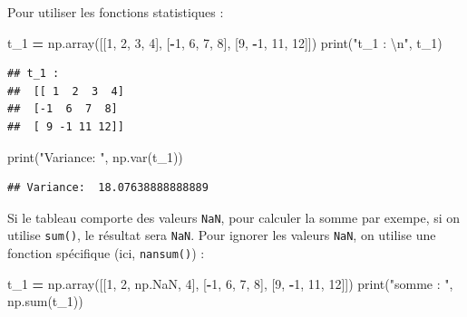 \documentclass[12pt,]{book}
\newenvironment{Shaded}{\begin{snugshade}}{\end{snugshade}}
\newcommand{\DecValTok}[1]{\textcolor[rgb]{0.00,0.00,0.81}{#1}}
\newcommand{\CharTok}[1]{\textcolor[rgb]{0.31,0.60,0.02}{#1}}
\newcommand{\StringTok}[1]{\textcolor[rgb]{0.31,0.60,0.02}{#1}}
\newcommand{\OperatorTok}[1]{\textcolor[rgb]{0.81,0.36,0.00}{\textbf{#1}}}
\newcommand{\BuiltInTok}[1]{#1}
\newcommand{\NormalTok}[1]{#1}
\numberwithin{equation}{section}
\numberwithin{countremarque}{section}
\begin{document}
Pour utiliser les fonctions statistiques :

\begin{Shaded}
\begin{Highlighting}[]
\NormalTok{t_1 }\OperatorTok{=}\NormalTok{ np.array([[}\DecValTok{1}\NormalTok{, }\DecValTok{2}\NormalTok{, }\DecValTok{3}\NormalTok{, }\DecValTok{4}\NormalTok{], [}\OperatorTok{-}\DecValTok{1}\NormalTok{, }\DecValTok{6}\NormalTok{, }\DecValTok{7}\NormalTok{, }\DecValTok{8}\NormalTok{], [}\DecValTok{9}\NormalTok{, }\OperatorTok{-}\DecValTok{1}\NormalTok{, }\DecValTok{11}\NormalTok{, }\DecValTok{12}\NormalTok{]])}
\BuiltInTok{print}\NormalTok{(}\StringTok{"t_1 : }\CharTok{\textbackslash{}n}\StringTok{"}\NormalTok{, t_1)}
\end{Highlighting}
\end{Shaded}

\begin{lstlisting}
## t_1 : 
##  [[ 1  2  3  4]
##  [-1  6  7  8]
##  [ 9 -1 11 12]]
\end{lstlisting}

\begin{Shaded}
\begin{Highlighting}[]
\BuiltInTok{print}\NormalTok{(}\StringTok{"Variance: "}\NormalTok{, np.var(t_1))}
\end{Highlighting}
\end{Shaded}

\begin{lstlisting}
## Variance:  18.07638888888889
\end{lstlisting}

Si le tableau comporte des valeurs \texttt{NaN}, pour calculer la somme
par exempe, si on utilise \texttt{sum()}, le résultat sera \texttt{NaN}.
Pour ignorer les valeurs \texttt{NaN}, on utilise une fonction
spécifique (ici, \texttt{nansum()}) :

\begin{Shaded}
\begin{Highlighting}[]
\NormalTok{t_1 }\OperatorTok{=}\NormalTok{ np.array([[}\DecValTok{1}\NormalTok{, }\DecValTok{2}\NormalTok{, np.NaN, }\DecValTok{4}\NormalTok{], [}\OperatorTok{-}\DecValTok{1}\NormalTok{, }\DecValTok{6}\NormalTok{, }\DecValTok{7}\NormalTok{, }\DecValTok{8}\NormalTok{], [}\DecValTok{9}\NormalTok{, }\OperatorTok{-}\DecValTok{1}\NormalTok{, }\DecValTok{11}\NormalTok{, }\DecValTok{12}\NormalTok{]])}
\BuiltInTok{print}\NormalTok{(}\StringTok{"somme : "}\NormalTok{, np.}\BuiltInTok{sum}\NormalTok{(t_1))}
\end{Highlighting}
\end{Shaded}
\end{document}
